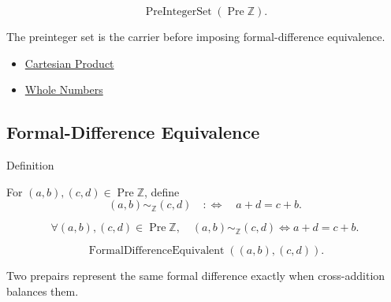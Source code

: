 \begin{remark*}
\[
\operatorname{PreIntegerSet}(\operatorname{Pre}\mathbb{Z}).
\]
\end{remark*}

\begin{remark*}[Interpretation]
The preinteger set is the carrier before imposing formal-difference
equivalence.
\end{remark*}

\begin{dependencies}
\begin{itemize}
  \item \hyperref[def:cartesian-product-rel]{Cartesian Product}
  \item \hyperref[def:whole-numbers]{Whole Numbers}
\end{itemize}
\end{dependencies}

\subsection*{Formal-Difference Equivalence}

\begin{definitionbox}{Definition}
\begin{definition}
\label{def:formal-difference-equivalence}
For $(a,b),(c,d)\in\operatorname{Pre}\mathbb{Z}$, define
\[
(a,b)\sim_{\mathbb{Z}}(c,d)
\quad:\Longleftrightarrow\quad
a+d=c+b.
\]
\end{definition}
\end{definitionbox}


\begin{remark*}
\[
\forall (a,b),(c,d)\in\operatorname{Pre}\mathbb{Z},\quad
(a,b)\sim_{\mathbb{Z}}(c,d)
\Longleftrightarrow
a+d=c+b.
\]
\end{remark*}

\begin{remark*}
\[
\operatorname{FormalDifferenceEquivalent}((a,b),(c,d)).
\]
\end{remark*}

\begin{remark*}[Interpretation]
Two prepairs represent the same formal difference exactly when cross-addition
balances them.
\end{remark*}

